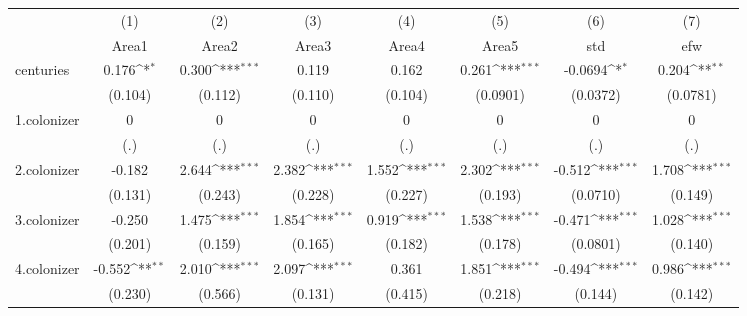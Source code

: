 {
\def\sym#1{\ifmmode^{#1}\else\(^{#1}\)\fi}
\begin{tabular}{l*{7}{c}}
\hline\hline
            &\multicolumn{1}{c}{(1)}&\multicolumn{1}{c}{(2)}&\multicolumn{1}{c}{(3)}&\multicolumn{1}{c}{(4)}&\multicolumn{1}{c}{(5)}&\multicolumn{1}{c}{(6)}&\multicolumn{1}{c}{(7)}\\
            &\multicolumn{1}{c}{Area1}&\multicolumn{1}{c}{Area2}&\multicolumn{1}{c}{Area3}&\multicolumn{1}{c}{Area4}&\multicolumn{1}{c}{Area5}&\multicolumn{1}{c}{std}&\multicolumn{1}{c}{efw}\\
\hline
centuries   &       0.176\sym{*}  &       0.300\sym{***}&       0.119         &       0.162         &       0.261\sym{***}&     -0.0694\sym{*}  &       0.204\sym{**} \\
            &     (0.104)         &     (0.112)         &     (0.110)         &     (0.104)         &    (0.0901)         &    (0.0372)         &    (0.0781)         \\
[1em]
1.colonizer &           0         &           0         &           0         &           0         &           0         &           0         &           0         \\
            &         (.)         &         (.)         &         (.)         &         (.)         &         (.)         &         (.)         &         (.)         \\
[1em]
2.colonizer &      -0.182         &       2.644\sym{***}&       2.382\sym{***}&       1.552\sym{***}&       2.302\sym{***}&      -0.512\sym{***}&       1.708\sym{***}\\
            &     (0.131)         &     (0.243)         &     (0.228)         &     (0.227)         &     (0.193)         &    (0.0710)         &     (0.149)         \\
[1em]
3.colonizer &      -0.250         &       1.475\sym{***}&       1.854\sym{***}&       0.919\sym{***}&       1.538\sym{***}&      -0.471\sym{***}&       1.028\sym{***}\\
            &     (0.201)         &     (0.159)         &     (0.165)         &     (0.182)         &     (0.178)         &    (0.0801)         &     (0.140)         \\
[1em]
4.colonizer &      -0.552\sym{**} &       2.010\sym{***}&       2.097\sym{***}&       0.361         &       1.851\sym{***}&      -0.494\sym{***}&       0.986\sym{***}\\
            &     (0.230)         &     (0.566)         &     (0.131)         &     (0.415)         &     (0.218)         &     (0.144)         &     (0.142)         \\

\end{tabular}}
